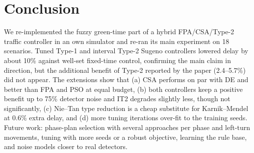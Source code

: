 \section{Conclusion}
We re-implemented the fuzzy green-time part of a hybrid FPA/CSA/Type-2 traffic controller in an own simulator and re-ran its main experiment on 18 scenarios. Tuned Type-1 and interval Type-2 Sugeno controllers lowered delay by about 10\% against well-set fixed-time control, confirming the main claim in direction, but the additional benefit of Type-2 reported by the paper (2.4--5.7\%) did not appear. The extensions show that (a) CSA performs on par with DE and better than FPA and PSO at equal budget, (b) both controllers keep a positive benefit up to 75\% detector noise and IT2 degrades slightly less, though not significantly, (c) Nie--Tan type reduction is a cheap substitute for Karnik--Mendel at 0.6\% extra delay, and (d) more tuning iterations over-fit to the training seeds. Future work: phase-plan selection with several approaches per phase and left-turn movements, tuning with more seeds or a robust objective, learning the rule base, and noise models closer to real detectors.
